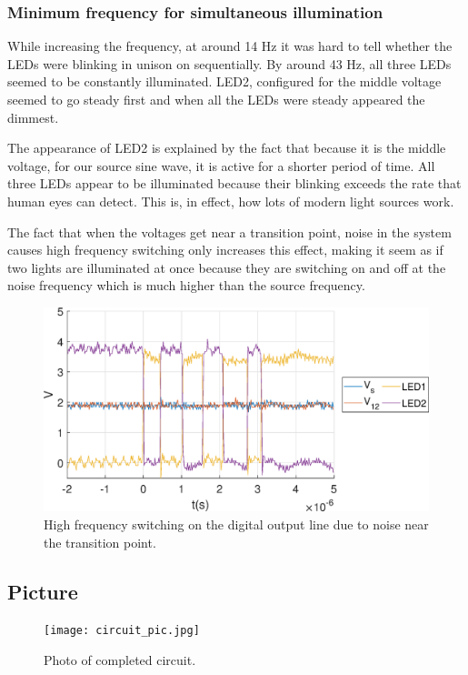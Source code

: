 \documentclass{article}
\begin{document}
\subsubsection{Minimum frequency for simultaneous illumination}
While increasing the frequency, at around 14 Hz it was hard to tell whether the LEDs were blinking in unison on sequentially. By around 43 Hz, all three LEDs seemed to be constantly illuminated. LED2, configured for the middle voltage seemed to go steady first and when all the LEDs were steady appeared the dimmest.

The appearance of LED2 is explained by the fact that because it is the middle voltage, for our source sine wave, it is active for a shorter period of time. All three LEDs appear to be illuminated because their blinking exceeds the rate that human eyes can detect. This is, in effect, how lots of modern light sources work.

The fact that when the voltages get near a transition point, noise in the system causes high frequency switching only increases this effect, making it seem as if two lights are illuminated at once because they are switching on and off at the noise frequency which is much higher than the source frequency.

\begin{figure}[H]
	\centering
	\includegraphics[keepaspectratio,width=.8\linewidth]{50hz_zoom2.eps}
	\caption{High frequency switching on the digital output line due to noise near the transition point.}
\end{figure}

\subsection{Picture}
\begin{figure}[H]
	\centering
	\texttt{[image: circuit\_pic.jpg]}
	\caption{Photo of completed circuit.}
\end{figure}
\end{document}
